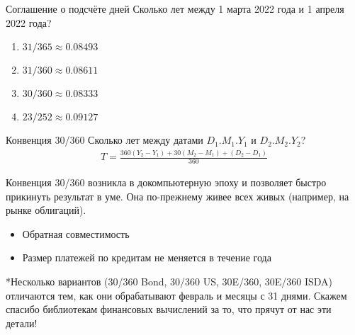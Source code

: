 \documentclass{beamer}
\begin{document}
\begin{frame}{Соглашение о подсчёте дней}
\justify
Сколько лет между 1 марта 2022 года и 1 апреля 2022 года?
\begin{enumerate}[label=\Alph*]
\item $31/365 \approx 0.08493$ 
\item $31/360 \approx 0.08611$ 
\item $30/360 \approx 0.08333$ 
\item $23/252 \approx 0.09127$ 
\end{enumerate}

\vspace{\baselineskip}
\end{frame}



\begin{frame}{Конвенция 30/360}
\justify
Сколько лет между датами $D_1.M_1.Y_1$ и $D_2.M_2.Y_2$?
\begin{align*}
T = \frac{360(Y_2-Y_1) + 30(M_2-M_1) + (D_2-D_1)}{360}
\end{align*}

\justify
Конвенция 30/360 возникла в докомпьютерную эпоху и позволяет быстро прикинуть результат в уме. Она по-прежнему живее всех живых (например, на рынке облигаций).
\begin{itemize}
\item Обратная совместимость
\item Размер платежей по кредитам не меняется в течение года
\end{itemize}

\vspace{\baselineskip}
\justify
*Несколько вариантов (30/360 Bond, 30/360 US, 30E/360, 30E/360 ISDA) отличаются тем, как они обрабатывают февраль и месяцы с 31 днями. Скажем спасибо библиотекам финансовых вычислений за то, что прячут от нас эти детали!
\end{frame}
\end{document}
